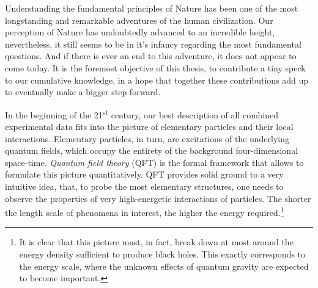Understanding the fundamental principles of Nature has been one of the most
longstanding and remarkable adventures of the human civilization.
Our perception of Nature has undoubtedly advanced to an incredible height,
nevertheless, it still seems to be in it's infancy regarding the most
fundamental questions. And if there is ever an end to this adventure, it does
not appear to come today.
It is the foremost objective of this thesis, to
contribute a tiny speck to our cumulative knowledge,
in a hope that together these contributions add up to eventually make a bigger step forward.

In the beginning of the 21\textsuperscript{st} century, our best description of all combined experimental data fits into the picture of elementary particles and their local interactions.
Elementary particles, in turn, are excitations of the underlying quantum fields, which occupy the entirety of the background four-dimensional space-time.
\emph{Quantum field theory} (QFT) is the formal framework that allows to formulate this picture quantitatively.
QFT provides solid ground to a very intuitive idea,
that, to probe the most elementary structures, one needs to observe the properties of very high-energetic interactions of particles.
The shorter the length scale of phenomena in interest, the higher the energy required.\footnote{
  It is clear that this picture must, in fact, break down at most around the energy density sufficient to produce black holes.
  This exactly corresponds to the energy scale, where the unknown effects of quantum gravity are expected to become important.
}

